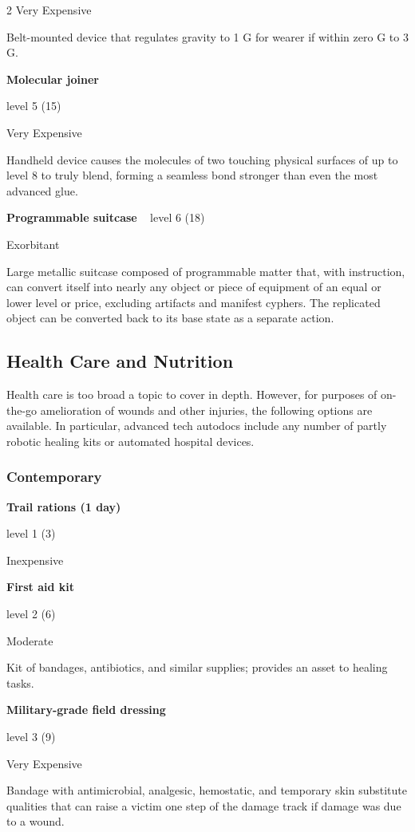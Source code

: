 \begin{multicols}{2}
Very Expensive 

Belt-mounted device that regulates gravity to 1 G for wearer if within zero G to 3 G. 

\textbf{Molecular joiner} 

level 5 (15) 

Very Expensive 

Handheld device causes the molecules of two touching physical surfaces of up to level 8 to truly blend, forming a seamless bond stronger than even the most advanced glue. 

\textbf{Programmable suitcase}
 
level 6 (18) 

Exorbitant 

Large metallic suitcase composed of programmable matter that, with instruction, can convert itself into nearly any object or piece of equipment of an equal or lower level or price, excluding artifacts and manifest cyphers. The replicated object can be converted back to its base state as a separate action.

\subsection{Health Care and Nutrition}

Health care is too broad a topic to cover in depth. However, for purposes of on-the-go amelioration of wounds and other injuries, the following options are available. In particular, advanced tech autodocs include any number of partly robotic healing kits or automated hospital devices.

\subsubsection{Contemporary}

\textbf{Trail rations (1 day)} 

level 1 (3) 

Inexpensive 

\textbf{First aid kit} 

level 2 (6) 

Moderate 

Kit of bandages, antibiotics, and similar supplies; provides an asset to healing tasks. 

\textbf{Military-grade field dressing} 

level 3 (9) 

Very Expensive 

Bandage with antimicrobial, analgesic, hemostatic, and temporary skin substitute qualities that can raise a victim one step of the damage track if damage was due to a wound.


\end{multicols}
